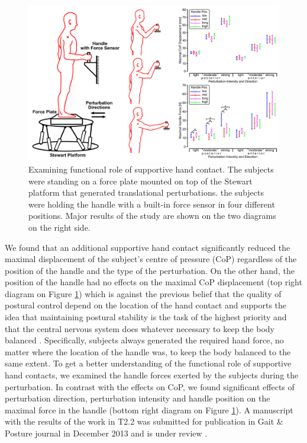 \documentclass[12pt,a4paper,twoside]{article}
\begin{document}
\begin{figure}
\centering
\includegraphics[width=0.8\hsize]{images/exp1_JSI.png}
\caption{Examining functional role of supportive hand contact. The subjects were standing on a force plate mounted on top of the Stewart platform that generated translational perturbations. the subjects were holding the handle with a built-in force sensor in four different positions. Major results of the study are shown on the two diagrams on the right side.}
\label{fig:exp_paper_W2}
\end{figure}

We found that an additional supportive hand contact significantly reduced the maximal displacement of the subject's centre of pressure (CoP) regardless of the position of the handle and the type of the perturbation. On the other hand, the position of the handle had no effects on the maximal CoP displacement (top right diagram on Figure \ref{fig:exp_paper_W2}) which is against the previous belief that the quality of postural control depend on the location of the hand contact \cite{Sarraf2014} and supports the idea that maintaining postural stability is the task of the highest priority and that the central nervous system does whatever necessary to keep the body balanced \cite{Winter1995}. Specifically, subjects always generated the required hand force, no matter where the location of the handle was, to keep the body balanced to the same extent. To get a better understanding of the functional role of supportive hand contacts, we examined the handle forces exerted by the subjects during the perturbation. In contrast with the effects on CoP, we found significant effects of perturbation direction, perturbation intensity and handle position on the maximal force in the handle (bottom right diagram on Figure \ref{fig:exp_paper_W2}). A manuscript with the results of the work in T2.2 was submitted for publication in Gait \& Posture journal in December 2013 and is under review \cite{Babic2014}.
\end{document}
